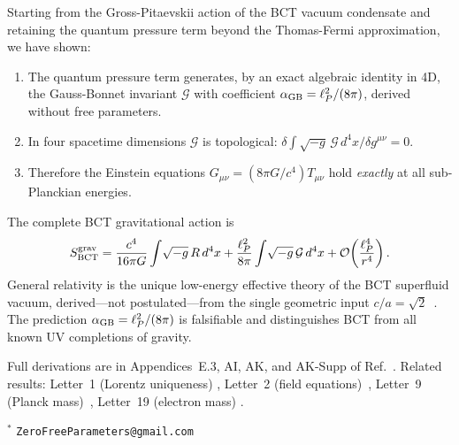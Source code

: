 \documentclass[twocolumn,10pt,a4paper]{article}
\begin{document}
Starting from the Gross-Pitaevskii action of the BCT vacuum condensate
and retaining the quantum pressure term beyond the Thomas-Fermi
approximation, we have shown:

\begin{enumerate}
  \item The quantum pressure term generates, by an exact algebraic
    identity in 4D, the Gauss-Bonnet invariant $\mathcal{G}$ with
    coefficient $\alpha_{\rm GB} = \ell_P^2/(8\pi)$, derived without
    free parameters.
  \item In four spacetime dimensions $\mathcal{G}$ is topological:
    $\delta\!\int\!\sqrt{-g}\,\mathcal{G}\,d^4x / \delta g^{\mu\nu} = 0$.
  \item Therefore the Einstein equations $G_{\mu\nu} =
    (8\pi G/c^4)T_{\mu\nu}$ hold \textit{exactly} at all sub-Planckian
    energies.
\end{enumerate}

The complete BCT gravitational action is
\begin{equation*}
  S_{\rm BCT}^{\rm grav} = \frac{c^4}{16\pi G}\int\!\sqrt{-g}\,R\,d^4x
  + \frac{\ell_P^2}{8\pi}\int\!\sqrt{-g}\,\mathcal{G}\,d^4x
  + \mathcal{O}\!\left(\frac{\ell_P^4}{r^4}\right).
\end{equation*}
General relativity is the unique low-energy effective theory of the BCT
superfluid vacuum, derived---not postulated---from the single geometric
input $c/a = \sqrt{2}$~\cite{lorentz}. The prediction
$\alpha_{\rm GB} = \ell_P^2/(8\pi)$ is falsifiable and distinguishes
BCT from all known UV completions of gravity.

Full derivations are in Appendices~E.3, AI, AK, and AK-Supp of
Ref.~\cite{monograph}. Related results: Letter~1 (Lorentz uniqueness)
\cite{lorentz}, Letter~2 (field equations)~\cite{fieldequations},
Letter~9 (Planck mass)~\cite{planck}, Letter~19 (electron mass)
\cite{electron}.

\vspace{4pt}
\noindent$^\ast$ \texttt{ZeroFreeParameters@gmail.com}
\end{document}
